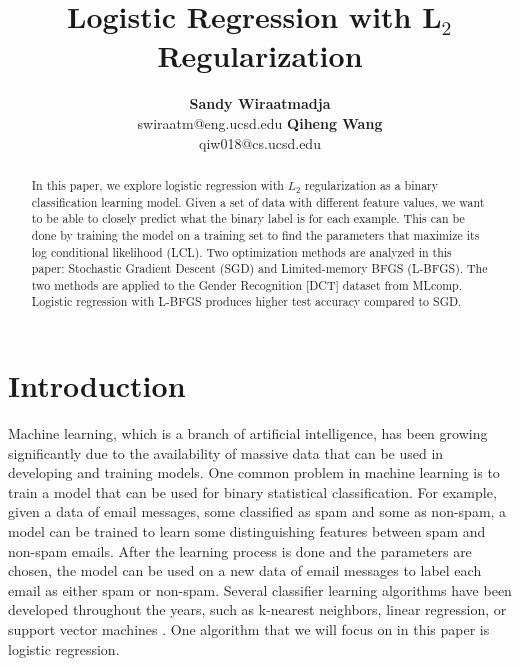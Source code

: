 \documentclass{article} %
\title{\bf Logistic Regression with L$_2$ Regularization}
\author {\textbf{Sandy Wiraatmadja}\\
	swiraatm@eng.ucsd.edu
		\And
		\textbf{Qiheng Wang}\\
		qiw018@cs.ucsd.edu
}
\begin{document}
\maketitle


\begin{abstract}
In this paper, we explore logistic regression with $L_2$ regularization as a binary classification learning model. Given a set of data with different feature values, we want to be able to closely predict what the binary label is for each example. This can be done by training the model on a training set to find the parameters that maximize its log conditional likelihood (LCL). Two optimization methods are analyzed in this paper: Stochastic Gradient Descent (SGD) and Limited-memory BFGS (L-BFGS). The two methods are applied to the Gender Recognition [DCT] dataset from MLcomp. Logistic regression with L-BFGS produces higher test accuracy compared to SGD.


\end{abstract}


\section{Introduction}
\label{sec:intro}

Machine learning, which is a branch of artificial intelligence, has been growing significantly due to the availability of massive data that can be used in developing and training models. One common problem in machine learning is to train a model that can be used for binary statistical classification. For example, given a data of email messages, some classified as spam and some as non-spam, a model can be trained to learn some distinguishing features between spam and non-spam emails. After the learning process is done and the parameters are chosen, the model can be used on a new data of email messages to label each email as either spam or non-spam. Several classifier learning algorithms have been developed throughout the years, such as k-nearest neighbors, linear regression, or support vector machines \cite{wiki_classifier}. One algorithm that we will focus on in this paper is logistic regression.

\end{document}
